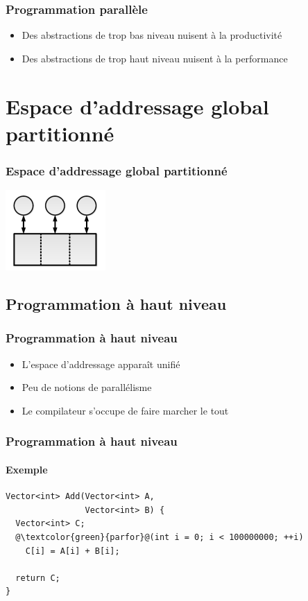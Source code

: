 \documentclass{beamer}
\begin{document}
\begin{frame}
\frametitle{Programmation parallèle}
\begin{itemize}
\item Des abstractions de trop bas niveau nuisent à la productivité
\item Des abstractions de trop haut niveau nuisent à la performance
\end{itemize}
\end{frame}

\section{Espace d'addressage global partitionné}
\begin{frame}
\frametitle{Espace d'addressage global partitionné}
\begin{center}
\includegraphics[scale=3]{pgas.png}
\end{center}
\end{frame}

\subsection{Programmation à haut niveau}
\begin{frame}
\frametitle{Programmation à haut niveau}
\begin{itemize}
\item L'espace d'addressage apparaît unifié
\item Peu de notions de parallélisme
\item Le compilateur s'occupe de faire marcher le tout
\end{itemize}
\end{frame}

\begin{frame}[fragile]
\frametitle{Programmation à haut niveau}
\framesubtitle{Exemple}
\begin{lstlisting}
Vector<int> Add(Vector<int> A, 
                Vector<int> B) {
  Vector<int> C;
  @\textcolor{green}{parfor}@(int i = 0; i < 100000000; ++i)
    C[i] = A[i] + B[i];  
  
  return C;
}
\end{lstlisting}
\end{frame}
\end{document}
